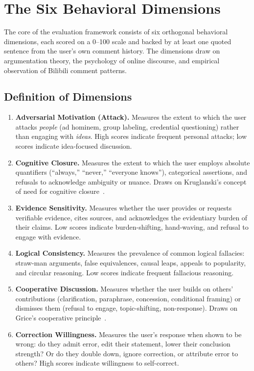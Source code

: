 \documentclass[11pt,a4paper]{article}
\begin{document}
\section{The Six Behavioral Dimensions}

The core of the evaluation framework consists of six orthogonal behavioral dimensions,
each scored on a 0--100 scale and backed by at least one quoted sentence from the
user's own comment history. The dimensions draw on argumentation theory, the psychology
of online discourse, and empirical observation of Bilibili comment patterns.

\subsection{Definition of Dimensions}

\begin{enumerate}
  \item \textbf{Adversarial Motivation (Attack).} Measures the extent to which the user
    attacks \textit{people} (ad hominem, group labeling, credential questioning) rather
    than engaging with \textit{ideas}. High scores indicate frequent personal attacks;
    low scores indicate idea-focused discussion.

  \item \textbf{Cognitive Closure.} Measures the extent to which the user employs
    absolute quantifiers (``always,'' ``never,'' ``everyone knows''), categorical
    assertions, and refusals to acknowledge ambiguity or nuance. Draws on
    Kruglanski's concept of need for cognitive closure~\cite{kruglanski1996motivated}.

  \item \textbf{Evidence Sensitivity.} Measures whether the user provides or requests
    verifiable evidence, cites sources, and acknowledges the evidentiary burden of
    their claims. Low scores indicate burden-shifting, hand-waving, and refusal to
    engage with evidence.

  \item \textbf{Logical Consistency.} Measures the prevalence of common logical
    fallacies: straw-man arguments, false equivalences, causal leaps, appeals to
    popularity, and circular reasoning. Low scores indicate frequent fallacious
    reasoning.

  \item \textbf{Cooperative Discussion.} Measures whether the user builds on others'
    contributions (clarification, paraphrase, concession, conditional framing) or
    dismisses them (refusal to engage, topic-shifting, non-response). Draws on
    Grice's cooperative principle~\cite{grice1975logic}.

  \item \textbf{Correction Willingness.} Measures the user's response when shown
    to be wrong: do they admit error, edit their statement, lower their conclusion
    strength? Or do they double down, ignore correction, or attribute error to others?
    High scores indicate willingness to self-correct.
\end{enumerate}
\end{document}
